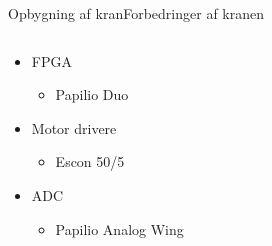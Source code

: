 \begin{frame}{Opbygning af kran}{Forbedringer af kranen}

\begin{columns}[T]
\begin{column}{.35\textwidth}

  \begin{itemize}
    \item<1-> FPGA
        \begin{itemize}
          \item<1-> Papilio Duo
        \end{itemize}
    \vspace{0.8cm}
    \item<2-> Motor drivere
        \begin{itemize}
          \item<1-> Escon 50/5  
        \end{itemize}
    \vspace{0.8cm}
    \item<3-> ADC
        \begin{itemize}
          \item<1-> Papilio Analog Wing 
        \end{itemize}
  \end{itemize}
\end{column}%
\hfill%
\begin{column}{.65\textwidth}


\end{column}
\end{columns}
\end{frame}
